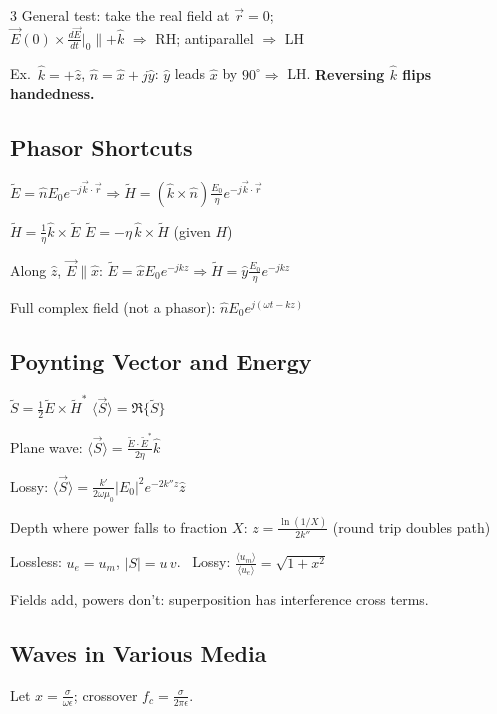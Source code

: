 \documentclass[11pt]{article}
\begin{document}
\begin{multicols*}{3}
General test: take the real field at $\vec r=0$; \\
$\vec E(0)\times\frac{d\vec E}{dt}\big|_0\parallel+\hat k$ $\Rightarrow$ RH; antiparallel $\Rightarrow$ LH

Ex.\ $\hat k = +\hat z$, $\hat n = \hat x + j\hat y$: $\hat y$ leads $\hat x$ by $90^\circ\Rightarrow$ LH. \textbf{Reversing $\hat k$ flips handedness.}

\subsection*{Phasor Shortcuts}

$\tilde{E} = \hat nE_0e^{-j\vec k\cdot \vec r} \Rightarrow \tilde{H} = (\hat k\times\hat n)\frac{E_0}{\eta}e^{-j\vec k\cdot \vec r}$

$\tilde H=\frac1\eta\hat k\times\tilde E$ \quad $\tilde E=-\eta\,\hat k\times\tilde H$ (given $H$)

Along $\hat z$, $\vec E\parallel\hat x$: $\tilde{E} = \hat xE_0e^{-jkz} \Rightarrow \tilde{H} = \hat y\frac{E_0}{\eta}e^{-jkz}$

Full complex field (not a phasor): $\hat nE_0e^{j(\omega t-kz)}$

\subsection*{Poynting Vector and Energy}

$\tilde S=\frac{1}{2}\tilde E\times\tilde H^*$ \hfill $\langle\vec S\rangle = \Re\{\tilde S\}$

Plane wave: $\langle\vec S\rangle=\frac{\tilde E\cdot\tilde E^*}{2\eta}\hat k$

Lossy: $\langle\vec S\rangle=\frac{k'}{2\omega\mu_0}|E_0|^2e^{-2k''z}\hat z$

Depth where power falls to fraction $X$: $z=\frac{\ln(1/X)}{2k''}$ (round trip doubles path)

Lossless: $u_e=u_m$, $|S|=u\,v$. \ Lossy: $\frac{\langle u_m\rangle}{\langle u_e\rangle}=\sqrt{1+x^2}$

Fields add, powers don't: superposition has interference cross terms.

\subsection*{Waves in Various Media}

Let $x=\frac{\sigma}{\omega\epsilon}$; crossover $f_c=\frac{\sigma}{2\pi\epsilon}$.


\end{multicols*}
\end{document}
